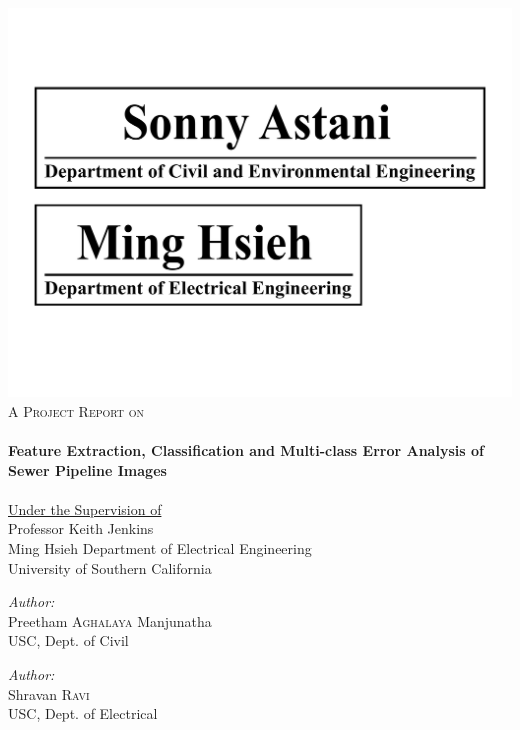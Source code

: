 \begin{titlepage}
\begin{center}
\includegraphics[scale = 0.25]{./sonny}\\[0.5cm]

\textsc{\Large A Project Report on}\\[0.25cm]



\HRule \\[0.4cm]
{ \huge \bfseries Feature Extraction, Classification and Multi-class Error Analysis of Sewer Pipeline Images}\\[0.1cm]
\HRule \\[0.5cm]


\large \underline{Under the Supervision of}\\
Professor Keith Jenkins \\ %
Ming Hsieh Department of Electrical Engineering\\
University of Southern California\\
\vspace{0.3in}


\begin{minipage}{0.4\textwidth}
\begin{flushleft} \large
\emph{Author:}\\
Preetham \textsc{Aghalaya} Manjunatha \\
USC, Dept. of Civil
\end{flushleft}
\end{minipage}%
\begin{minipage}{0.4\textwidth}
\begin{flushright} \large
\emph{Author:} \\
Shravan  \textsc{Ravi} \\
USC, Dept. of Electrical
\end{flushright}
\end{minipage}



\end{center}
\end{titlepage}
